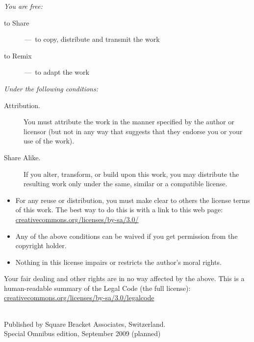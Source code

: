 \documentclass[a4paper,10pt,twoside]{book}
\begin{document}
\begin{footnotesize}
\emph{You are free:}
\begin{description}
  \item[to Share] \,---\, to copy, distribute and transmit the work
  \item[to Remix] \,---\, to adapt the work
\end{description}
\emph{Under the following conditions:}
\begin{description}
  \item[Attribution.] You must attribute the work in the manner specified by the author or licensor (but not in any way that suggests that they endorse you or your use of the work).
  \item[Share Alike.] If you alter, transform, or build upon this work, you may distribute the resulting work only under the same, similar or a compatible license.
\end{description}
\begin{itemize}
  \item For any reuse or distribution, you must make clear to others the license terms of this work. The best way to do this is with a link to this web page:
  \url{creativecommons.org/licenses/by-sa/3.0/}
  \item Any of the above conditions can be waived if you get permission from the copyright holder.
  \item Nothing in this license impairs or restricts the author's moral rights.
\end{itemize}
\quad
\parbox{\textwidth-2cm-1em}{
	Your fair dealing and other rights are in no way affected by the above.
	This is a human-readable summary of the Legal Code (the full license):\\
	\url{creativecommons.org/licenses/by-sa/3.0/legalcode}}\\[1cm]
Published by Square Bracket Associates, Switzerland. \sba\\
Special Omnibus edition, September 2009 (planned)
\end{footnotesize}
\vfill
%
\tableofcontents
\sloppy %

\mainmatter
\end{document}

